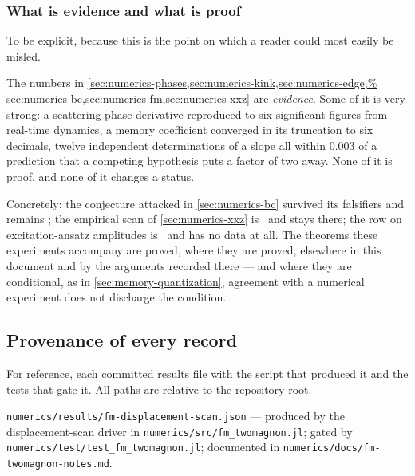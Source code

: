 \subsubsection*{What is evidence and what is proof}

To be explicit, because this is the point on which a reader could most easily
be misled.

The numbers in \cref{sec:numerics-phases,sec:numerics-kink,sec:numerics-edge,%
sec:numerics-bc,sec:numerics-fm,sec:numerics-xxz} are \emph{evidence}. Some of
it is very strong: a scattering-phase derivative reproduced to six significant
figures from real-time dynamics, a memory coefficient converged in its
truncation to six decimals, twelve independent determinations of a slope all
within $0.003$ of a prediction that a competing hypothesis puts a factor of
two away. None of it is proof, and none of it changes a status.

Concretely: the conjecture attacked in \cref{sec:numerics-bc} survived its
falsifiers and remains \statusConjecture; the empirical scan of
\cref{sec:numerics-xxz} is \statusSketch\ and stays there; the row on
excitation-ansatz amplitudes is \statusConjecture\ and has no data at all. The
theorems these experiments accompany are proved, where they are proved,
elsewhere in this document and by the arguments recorded there --- and where
they are conditional, as in \cref{sec:memory-quantization}, agreement with a
numerical experiment does not discharge the condition.

\subsection{Provenance of every record}\label{sec:numerics-provenance}

For reference, each committed results file with the script that produced it
and the tests that gate it. All paths are relative to the repository root.

\begingroup\sloppy

\texttt{numerics/\allowbreak{}results/\allowbreak{}fm-\allowbreak{}displacement-\allowbreak{}scan.json} --- produced by the
displacement-scan driver in \texttt{numerics/\allowbreak{}src/\allowbreak{}fm\_\allowbreak{}twomagnon.jl}; gated by
\texttt{numerics/\allowbreak{}test/\allowbreak{}test\_\allowbreak{}fm\_\allowbreak{}twomagnon.jl}; documented in
\texttt{numerics/\allowbreak{}docs/\allowbreak{}fm-\allowbreak{}twomagnon-\allowbreak{}notes.md}.

